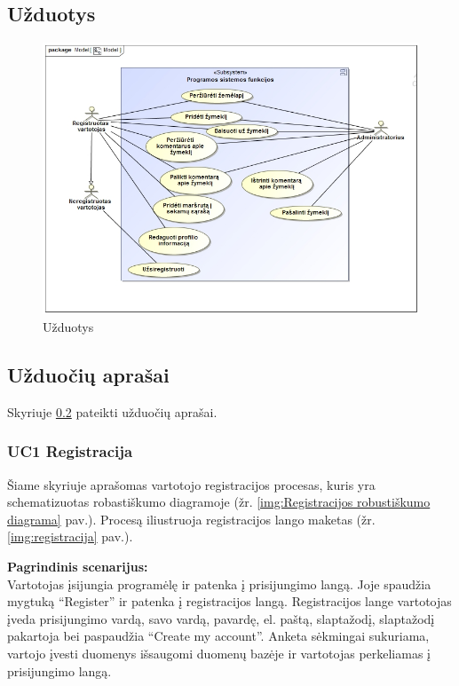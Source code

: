 \documentclass{VUMIFPSkursinis}
\begin{document}
\subsection{Užduotys}
	\begin{figure}[H]
				\centering
				\includegraphics[scale=0.5]{img/uzduotys}
				\caption{Užduotys}
				\label{img:uzduotys}
			\end{figure}

\subsection{Užduočių aprašai}
\label{sec:Užduočių aprašai}
Skyriuje \ref{sec:Užduočių aprašai} pateikti užduočių aprašai.
\subsubsection{UC1 Registracija}
	Šiame skyriuje aprašomas vartotojo registracijos procesas, kuris yra schematizuotas robastiškumo diagramoje (žr. \ref{img:Registracijos robustiškumo diagrama} pav.). 
	Procesą iliustruoja registracijos lango maketas (žr. \ref{img:registracija} pav.).

	\textbf{Pagrindinis scenarijus:}\\
	Vartotojas įsijungia programėlę ir patenka į prisijungimo langą. Joje spaudžia mygtuką “Register” ir patenka į registracijos langą. 
	Registracijos lange vartotojas įveda prisijungimo vardą, savo vardą, pavardę, el. paštą, slaptažodį, slaptažodį pakartoja bei paspaudžia 
	“Create my account”. Anketa sėkmingai sukuriama, vartojo įvesti duomenys išsaugomi duomenų bazėje ir vartotojas perkeliamas į prisijungimo langą.
\end{document}
